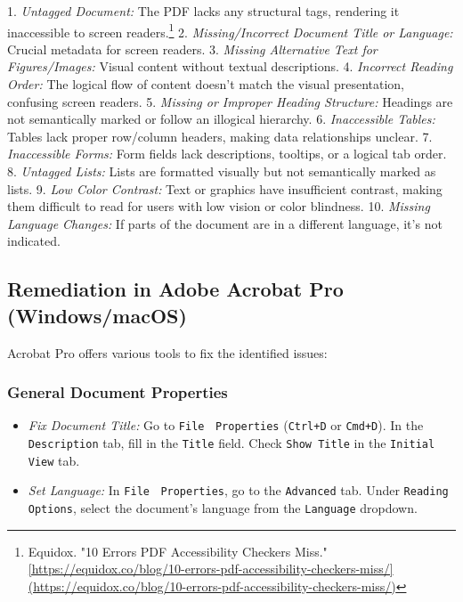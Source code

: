\begin{itemize}
1.  \emph{Untagged Document:} The PDF lacks any structural tags, rendering it inaccessible to screen readers.\footnote{Equidox. "10 Errors PDF Accessibility Checkers Miss." \url{[https://equidox.co/blog/10-errors-pdf-accessibility-checkers-miss/](https://equidox.co/blog/10-errors-pdf-accessibility-checkers-miss/)}}
2.  \emph{Missing/Incorrect Document Title or Language:} Crucial metadata for screen readers.
3.  \emph{Missing Alternative Text for Figures/Images:} Visual content without textual descriptions.
4.  \emph{Incorrect Reading Order:} The logical flow of content doesn't match the visual presentation, confusing screen readers.
5.  \emph{Missing or Improper Heading Structure:} Headings are not semantically marked or follow an illogical hierarchy.
6.  \emph{Inaccessible Tables:} Tables lack proper row/column headers, making data relationships unclear.
7.  \emph{Inaccessible Forms:} Form fields lack descriptions, tooltips, or a logical tab order.
8.  \emph{Untagged Lists:} Lists are formatted visually but not semantically marked as lists.
9.  \emph{Low Color Contrast:} Text or graphics have insufficient contrast, making them difficult to read for users with low vision or color blindness.
10. \emph{Missing Language Changes:} If parts of the document are in a different language, it's not indicated.

\subsection{Remediation in Adobe Acrobat Pro (Windows/macOS)}
\label{subsec:remediation-acrobat}
Acrobat Pro offers various tools to fix the identified issues:
\subsubsection{General Document Properties}
\label{subsubsec:doc-properties}

\begin{itemize}
\item \emph{Fix Document Title:} Go to \texttt{File} $\>$ \texttt{Properties} (\texttt{Ctrl+D} or \texttt{Cmd+D}). In the \texttt{Description} tab, fill in the \texttt{Title} field. Check \texttt{Show Title} in the \texttt{Initial View} tab.
\item \emph{Set Language:} In \texttt{File} $\>$ \texttt{Properties}, go to the \texttt{Advanced} tab. Under \texttt{Reading Options}, select the document's language from the \texttt{Language} dropdown.
\end{itemize}


\end{itemize}
